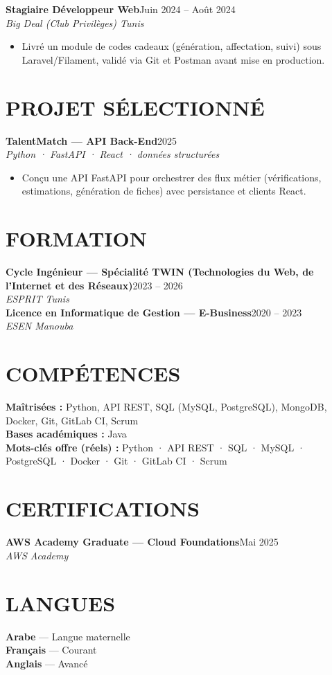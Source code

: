 \documentclass[10pt,a4paper]{article}
\newcommand{\TargetKeywords}{Python · API REST · SQL · MySQL · PostgreSQL · Docker · Git · GitLab CI · Scrum}
\newcommand{\job}[3]{%
  \textbf{\color{primary}#1}\hfill{\color{muted}\small #2}\\[-1pt]
  {\color{accent}\textit{#3}}\\[1pt]
  \begin{itemize}
}
\newcommand{\proj}[3]{%
  \textbf{\color{primary}#1}\hfill{\color{muted}\small #2}\\[-1pt]
  {\color{accent}\textit{#3}}\\[0.5pt]
  \begin{itemize}
}
\newcommand{\edu}[3]{%
  \textbf{\color{primary}#1}\hfill{\color{muted}\small #2}\\[-1pt]
  {\color{accent}\textit{#3}}\\[2pt]
}
\newcommand{\cert}[3]{%
  \textbf{\color{primary}\small #1}\hfill{\color{muted}\scriptsize #3}\\[-1pt]
  {\color{accent}\small\textit{#2}}\\[3pt]
}
\begin{document}
\job{Stagiaire Développeur Web}{Juin 2024 -- Août 2024}{Big Deal (Club Privilèges) \textbar{} Tunis}
  \item Livré un module de codes cadeaux (génération, affectation, suivi) sous Laravel/Filament, validé via Git et Postman avant mise en production.
\end{itemize}

\section{PROJET SÉLECTIONNÉ}
{\footnotesize
\proj{TalentMatch — API Back-End}{2025}{Python · FastAPI · React · données structurées}
  \item Conçu une API FastAPI pour orchestrer des flux métier (vérifications, estimations, génération de fiches) avec persistance et clients React.
\end{itemize}
}

\section{FORMATION}
\edu{Cycle Ingénieur — Spécialité TWIN (Technologies du Web, de l'Internet et des Réseaux)}{2023 -- 2026}{ESPRIT \textbar{} Tunis}
\edu{Licence en Informatique de Gestion — E-Business}{2020 -- 2023}{ESEN \textbar{} Manouba}

\section{COMPÉTENCES}
{\small
\textbf{\color{primary}Maîtrisées :} Python, API REST, SQL (MySQL, PostgreSQL), MongoDB, Docker, Git, GitLab CI, Scrum\\[2pt]
\textbf{\color{primary}Bases académiques :} Java\\[2pt]
\textbf{\color{primary}Mots-clés offre (réels) :} \TargetKeywords
}

\vspace{2pt}
\begin{minipage}[t]{0.62\textwidth}
\section{CERTIFICATIONS}
\cert{AWS Academy Graduate — Cloud Foundations}{AWS Academy}{Mai 2025}
\end{minipage}%
\hfill
\begin{minipage}[t]{0.34\textwidth}
\section{LANGUES}
{\small\textbf{Arabe} — Langue maternelle}\\[1pt]
{\small\textbf{Français} — Courant}\\[1pt]
{\small\textbf{Anglais} — Avancé}
\end{minipage}
\end{document}
